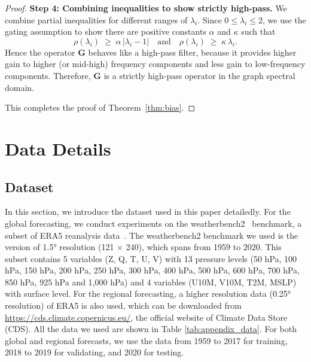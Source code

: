 \begin{proof}
\textbf{Step 4: Combining inequalities to show strictly high-pass.}  
We combine partial inequalities for different ranges of $\lambda_i$. 
Since $0 \le \lambda_i \le 2$, 
we use the gating assumption to show there are positive constants 
$\alpha$ and $\kappa$ such that
\[
\rho(\lambda_i) 
\;\ge\; 
\alpha \,\bigl|\lambda_i - 1\bigr|
\quad\text{and}\quad
\rho(\lambda_i) 
\;\ge\; 
\kappa \,\lambda_i.
\]
Hence the operator $\mathbf{G}$ behaves like a high-pass filter, because 
it provides higher gain to higher (or mid-high) frequency components and 
less gain to low-frequency components. 
Therefore, $\mathbf{G}$ is a strictly high-pass operator in the graph spectral 
domain.

This completes the proof of Theorem~\ref{thm:bias}.
\end{proof}




\section{Data Details}
\label{appendix:data}
\subsection{Dataset}
    In this section, we introduce the dataset used in this paper detailedly. For the global forecasting, we conduct experiments on the weatherbench2~\cite{rasp2024weatherbench} benchmark, a subset of ERA5 reanalysis data~\cite{hersbach2020era5}. The weatherbench2 benchmark we used is the version of 1.5° resolution (121 × 240), which spans from 1959 to 2020. This subset contains 5 variables (Z, Q, T, U, V) with 13 pressure levels (50 hPa, 100 hPa, 150 hPa, 200 hPa, 250 hPa, 300 hPa, 400 hPa, 500 hPa, 600 hPa, 700 hPa, 850 hPa, 925 hPa and 1,000 hPa) and 4 variables (U10M, V10M, T2M, MSLP) with surface level. For the regional forecasting, a higher resolution data (0.25° resolution) of ERA5 is also used, which can be downloaded from \url{https://cds.climate.copernicus.eu/}, the official website of Climate Data Store (CDS). All the data we used are shown in Table \ref{tab:appendix_data}. For both global and regional forecasts, we use the data from 1959 to 2017 for training, 2018 to 2019 for validating, and 2020 for testing.

